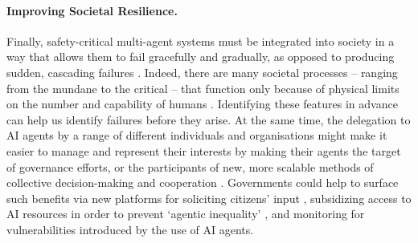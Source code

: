 \paragraph{Improving Societal Resilience.}
Finally, %
safety-critical multi-agent systems must be integrated into society in a way that allows them to fail gracefully and gradually, as opposed to producing sudden, cascading failures \citep{Maas2018,Bernardi2024}.
Indeed, there are many societal processes -- ranging from the mundane to the critical -- that function only because of physical limits on the number and capability of humans \citep[e.g.,][see also the examples in ]{VanLoo2019}.
Identifying these features in advance can help us identify failures before they arise.
At the same time, the delegation to AI agents by a range of different individuals and organisations might make it easier to manage and represent their interests by making their agents the target of governance efforts, or the participants of new, more scalable methods of collective decision-making and cooperation \citep{seger_democratising_2023,Huang2023,Domingos2022,Sourbut2024,Terrucha2024,oesterheld2022safe}.
Governments could help to surface such benefits via new platforms for soliciting citizens' input \citep[see, e.g.,][]{Small2021,Small2023,bakker_fine-tuning_2022,Fishkin2019,ovadya_generative_2023,Jarrett2023,Fish2023}, subsidizing access to AI resources in order to prevent `agentic inequality' \citep[see also ]{Gabriel2024}, and monitoring for vulnerabilities introduced by the use of AI agents.







